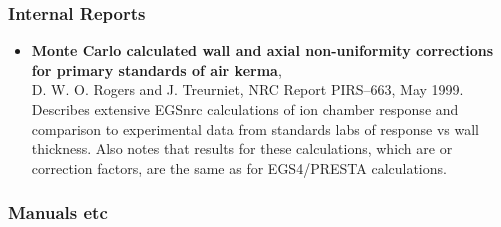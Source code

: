 \subsubsection{Internal Reports}
\begin{itemize} 
\item {\bfseries Monte Carlo calculated wall and axial non-uniformity
     corrections for primary standards of air kerma},\\
D. W. O.  Rogers and J. Treurniet, NRC Report PIRS--663, May 1999.\\Describes extensive EGSnrc
calculations of ion chamber response and comparison to experimental data
from standards labs of response vs wall thickness. Also notes that results
for these calculations, which are or correction factors, are the same as
for EGS4/PRESTA calculations.
\end{itemize} 

\subsubsection{Manuals etc}

